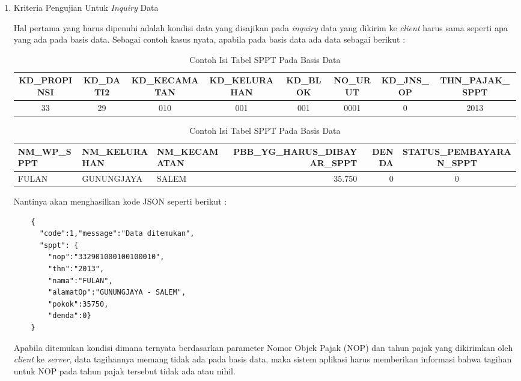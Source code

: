 \documentclass[pdftex,12pt, oneside]{article}
\begin{document}
\begin{enumerate}[1.]
  \item Kriteria Pengujian Untuk \textit{Inquiry} Data
  
  Hal pertama yang harus dipenuhi adalah kondisi data yang disajikan pada \textit{inquiry} data yang dikirim ke \textit{client} harus sama seperti apa yang ada pada basis data. Sebagai contoh kasus nyata, apabila pada basis data ada data sebagai berikut :
  \begin{table}[H]
    \resizebox{8cm}{!}
      {
        \begin{minipage}{1\textwidth}
        \begin{tabular}{|c|c|c|c|c|c|c|c|}
          \hline
          \textbf{KD\_PROPINSI} & \textbf{KD\_DATI2} & \textbf{KD\_KECAMATAN} & \textbf{KD\_KELURAHAN} & \textbf{KD\_BLOK} & \textbf{NO\_URUT} & \textbf{KD\_JNS\_OP} & \textbf{THN\_PAJAK\_SPPT} \\
          \hline \hline
          33 & 29 & 010 & 001 & 001 & 0001 & 0 & 2013 \\
          \hline
        \end{tabular}
  
        \begin{tabular}{|l|l|l|r|r|c|}
          \hline
      	  \textbf{NM\_WP\_SPPT} & \textbf{NM\_KELURAHAN} & \textbf{NM\_KECAMATAN} & \textbf{PBB\_YG\_HARUS\_DIBAYAR\_SPPT} & \textbf{DENDA} & \textbf{STATUS\_PEMBAYARAN\_SPPT} \\
   	      \hline \hline
       	  FULAN & GUNUNGJAYA & SALEM & 35.750 & 0 & 0 \\
       	  \hline
        \end{tabular}
        \centering
      \end{minipage}
    }
    \caption{Contoh Isi Tabel SPPT Pada Basis Data}
  \end{table}
  
  Nantinya akan menghasilkan kode JSON seperti berikut :
  
  \begin{lstlisting}
    {
      "code":1,"message":"Data ditemukan",
      "sppt": {
        "nop":"332901000100100010",
        "thn":"2013",
        "nama":"FULAN",
        "alamatOp":"GUNUNGJAYA - SALEM",
        "pokok":35750,
        "denda":0}
    }
  \end{lstlisting}
    
  Apabila ditemukan kondisi dimana ternyata berdasarkan parameter Nomor Objek Pajak (NOP) dan tahun pajak yang dikirimkan oleh \textit{client} ke \textit{server}, data tagihannya memang tidak ada pada basis data, maka sistem aplikasi harus memberikan informasi bahwa tagihan untuk NOP pada tahun pajak tersebut tidak ada atau nihil.
  

\end{enumerate}
\end{document}
